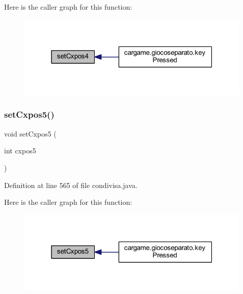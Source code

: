 Here is the caller graph for this function\+:
\nopagebreak
\begin{figure}[H]
\begin{center}
\leavevmode
\includegraphics[width=316pt]{classcargame_1_1condivisa_a63cb60098b1e4c023629879a0f46dd01_icgraph}
\end{center}
\end{figure}
\mbox{\label{classcargame_1_1condivisa_aec4b4784ef518fa0e3b553c56ee34161}} 
\subsubsection{\texorpdfstring{set\+Cxpos5()}{setCxpos5()}}
{\footnotesize\ttfamily void set\+Cxpos5 (\begin{DoxyParamCaption}\item[{int}]{cxpos5 }\end{DoxyParamCaption})}



Definition at line 565 of file condivisa.\+java.

Here is the caller graph for this function\+:
\nopagebreak
\begin{figure}[H]
\begin{center}
\leavevmode
\includegraphics[width=316pt]{classcargame_1_1condivisa_aec4b4784ef518fa0e3b553c56ee34161_icgraph}
\end{center}
\end{figure}
\mbox{\label{classcargame_1_1condivisa_a055bf748dacc07464a59c719b61403e4}} 
